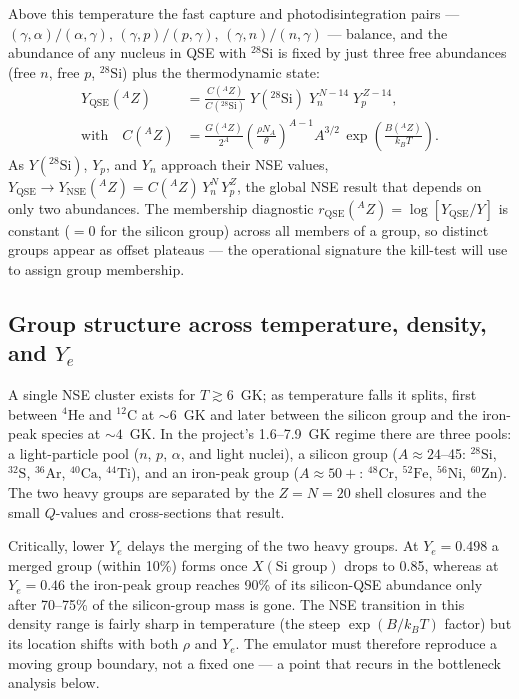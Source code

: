 \documentclass[11pt]{article}
\newcommand{\nuc}[2]{\ensuremath{{}^{#2}\mathrm{#1}}}
\begin{document}
Above this temperature the fast capture and photodisintegration pairs --- $(\gamma,\alpha)/(\alpha,\gamma)$, $(\gamma,p)/(p,\gamma)$, $(\gamma,n)/(n,\gamma)$ --- balance, and the abundance of any nucleus in QSE with $\nuc{Si}{28}$ is fixed by just three free abundances (free $n$, free $p$, $\nuc{Si}{28}$) plus the thermodynamic state:
\begin{align*}
Y_{\mathrm{QSE}}({}^{A}Z) &= \frac{C({}^{A}Z)}{C(\nuc{Si}{28})}\; Y(\nuc{Si}{28})\; Y_n^{\,N-14}\; Y_p^{\,Z-14}, \\[2pt]
\text{with}\quad C({}^{A}Z) &= \frac{G({}^{A}Z)}{2^{A}}\left(\frac{\rho N_A}{\theta}\right)^{\!A-1} A^{3/2}\,\exp\!\left(\frac{B({}^{A}Z)}{k_B T}\right).
\end{align*}
As $Y(\nuc{Si}{28})$, $Y_p$, and $Y_n$ approach their NSE values, $Y_{\mathrm{QSE}} \to Y_{\mathrm{NSE}}({}^{A}Z) = C({}^{A}Z)\,Y_n^{N}\,Y_p^{Z}$, the global NSE result that depends on only two abundances. The membership diagnostic $r_{\mathrm{QSE}}({}^{A}Z) = \log[Y_{\mathrm{QSE}}/Y]$ is constant ($=0$ for the silicon group) across all members of a group, so distinct groups appear as offset plateaus --- the operational signature the kill-test will use to assign group membership.

\subsection{Group structure across temperature, density, and \texorpdfstring{$Y_e$}{Ye}}

A single NSE cluster exists for $T \gtrsim 6$~GK; as temperature falls it splits, first between $\nuc{He}{4}$ and $\nuc{C}{12}$ at $\sim 6$~GK and later between the silicon group and the iron-peak species at $\sim 4$~GK. In the project's 1.6--7.9~GK regime there are three pools: a light-particle pool ($n$, $p$, $\alpha$, and light nuclei), a silicon group ($A \approx 24$--45: $\nuc{Si}{28}$, $\nuc{S}{32}$, $\nuc{Ar}{36}$, $\nuc{Ca}{40}$, $\nuc{Ti}{44}$), and an iron-peak group ($A \approx 50+$: $\nuc{Cr}{48}$, $\nuc{Fe}{52}$, $\nuc{Ni}{56}$, $\nuc{Zn}{60}$). The two heavy groups are separated by the $Z = N = 20$ shell closures and the small $Q$-values and cross-sections that result.

Critically, lower $Y_e$ delays the merging of the two heavy groups. At $Y_e = 0.498$ a merged group (within 10\%) forms once $X(\text{Si group})$ drops to 0.85, whereas at $Y_e = 0.46$ the iron-peak group reaches 90\% of its silicon-QSE abundance only after 70--75\% of the silicon-group mass is gone. The NSE transition in this density range is fairly sharp in temperature (the steep $\exp(B/k_B T)$ factor) but its location shifts with both $\rho$ and $Y_e$. The emulator must therefore reproduce a moving group boundary, not a fixed one --- a point that recurs in the bottleneck analysis below.
\end{document}
